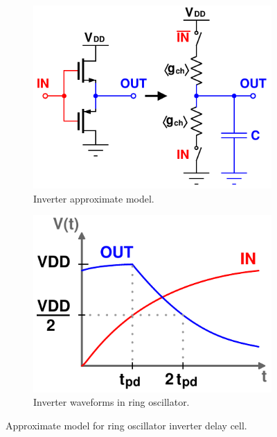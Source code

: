 		\begin{figure}[htb!]
	        \centering
	        \begin{subfigure}{.45\textwidth}
	            \centering
	            \includegraphics[width=\linewidth]{figs/design/inv_rc_model}
	            \caption{Inverter approximate model.}
	            \label{fig:inv_cir}
	        \end{subfigure}%
	        \begin{subfigure}{.5\textwidth}
	            \centering
	            \includegraphics[width=0.8\linewidth]{figs/design/inv_waves}
	            \caption{Inverter waveforms in ring oscillator.}
	            \label{fig:inv_wave}
	        \end{subfigure}
	        \caption{Approximate model for ring oscillator inverter delay cell.}
	        \label{fig:inv_model}
	    \end{figure}

